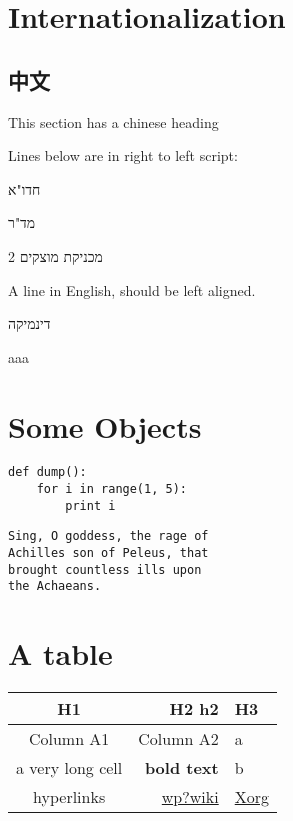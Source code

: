 \section{Internationalization}



\subsection{中文}

This section has a chinese heading



Lines below are in right to left script:



חדו"א

מד"ר

מכניקת מוצקים 2

A line in English, should be left aligned.

דינמיקה



aaa





\section{Some Objects}




\begin{lstlisting}
def dump():
	for i in range(1, 5):
		print i

\end{lstlisting}





\begin{lstlisting}
Sing, O goddess, the rage of
Achilles son of Peleus, that
brought countless ills upon
the Achaeans.

\end{lstlisting}


\section{A table}



\begin{tabular}{ |c|r|l| }
\hline
 H1 & H2 h2 & H3 \tabularnewline
\hline
\hline
 Column A1 & Column A2 & a \tabularnewline
\hline
 a very long cell & \textbf{bold text} & b \tabularnewline
\hline
 hyperlinks & \href{interwiki:wp?wiki}{wp?wiki} & \href{http://x.org}{Xorg} \tabularnewline
\hline
\end{tabular}


